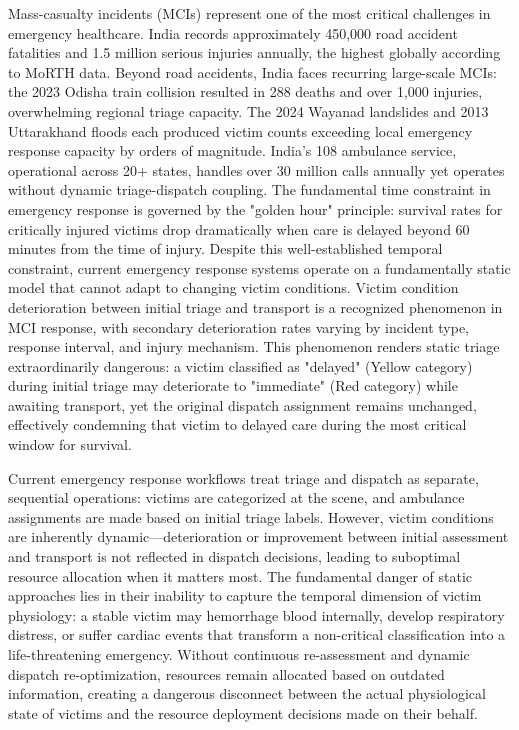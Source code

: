 \documentclass[conference]{IEEEtran}
\begin{document}
Mass-casualty incidents (MCIs) represent one of the most critical challenges in emergency healthcare. India records approximately 450,000 road accident fatalities and 1.5 million serious injuries annually, the highest globally according to MoRTH data. Beyond road accidents, India faces recurring large-scale MCIs: the 2023 Odisha train collision resulted in 288 deaths and over 1,000 injuries, overwhelming regional triage capacity. The 2024 Wayanad landslides and 2013 Uttarakhand floods each produced victim counts exceeding local emergency response capacity by orders of magnitude. India's 108 ambulance service, operational across 20+ states, handles over 30 million calls annually \cite{gvkemri2022} yet operates without dynamic triage-dispatch coupling. The fundamental time constraint in emergency response is governed by the "golden hour" principle: survival rates for critically injured victims drop dramatically when care is delayed beyond 60 minutes from the time of injury. Despite this well-established temporal constraint, current emergency response systems operate on a fundamentally static model that cannot adapt to changing victim conditions. Victim condition deterioration between initial triage and transport is a recognized phenomenon in MCI response, with secondary deterioration rates varying by incident type, response interval, and injury mechanism. This phenomenon renders static triage extraordinarily dangerous: a victim classified as "delayed" (Yellow category) during initial triage may deteriorate to "immediate" (Red category) while awaiting transport, yet the original dispatch assignment remains unchanged, effectively condemning that victim to delayed care during the most critical window for survival.

Current emergency response workflows treat triage and dispatch as separate, sequential operations: victims are categorized at the scene, and ambulance assignments are made based on initial triage labels. However, victim conditions are inherently dynamic---deterioration or improvement between initial assessment and transport is not reflected in dispatch decisions, leading to suboptimal resource allocation when it matters most. The fundamental danger of static approaches lies in their inability to capture the temporal dimension of victim physiology: a stable victim may hemorrhage blood internally, develop respiratory distress, or suffer cardiac events that transform a non-critical classification into a life-threatening emergency. Without continuous re-assessment and dynamic dispatch re-optimization, resources remain allocated based on outdated information, creating a dangerous disconnect between the actual physiological state of victims and the resource deployment decisions made on their behalf.
\end{document}
